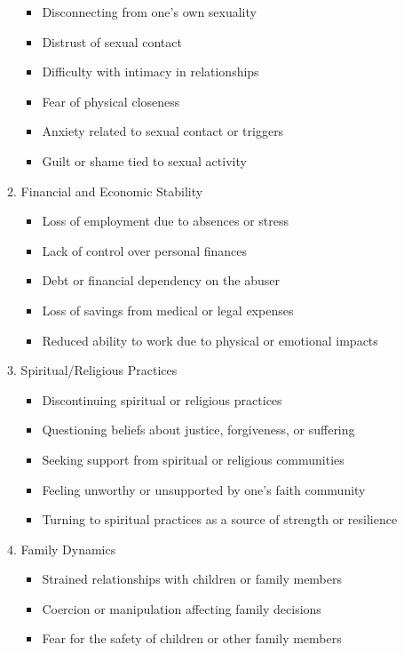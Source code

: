 \documentclass[letterpaper, 10pt]{article}
\begin{document}
\begin{enumerate}
\begin{enumerate}
\begin{itemize}
            \item Disconnecting from one’s own sexuality
            \item Distrust of sexual contact
            \item Difficulty with intimacy in relationships
            \item Fear of physical closeness
            \item Anxiety related to sexual contact or triggers
            \item Guilt or shame tied to sexual activity
        \end{itemize}
        \item Financial and Economic Stability
        \begin{itemize}
            \item Loss of employment due to absences or stress
            \item Lack of control over personal finances
            \item Debt or financial dependency on the abuser
            \item Loss of savings from medical or legal expenses
            \item Reduced ability to work due to physical or emotional impacts
        \end{itemize}
        \item Spiritual/Religious Practices
        \begin{itemize}
            \item Discontinuing spiritual or religious practices
            \item  Questioning beliefs about justice, forgiveness, or suffering
            \item  Seeking support from spiritual or religious communities
            \item  Feeling unworthy or unsupported by one's faith community
            \item  Turning to spiritual practices as a source of strength or resilience
        \end{itemize}
        \item Family Dynamics
        \begin{itemize}
            \item Strained relationships with children or family members
            \item Coercion or manipulation affecting family decisions
            \item Fear for the safety of children or other family members

\end{itemize}
\end{enumerate}
\end{enumerate}
\end{document}
